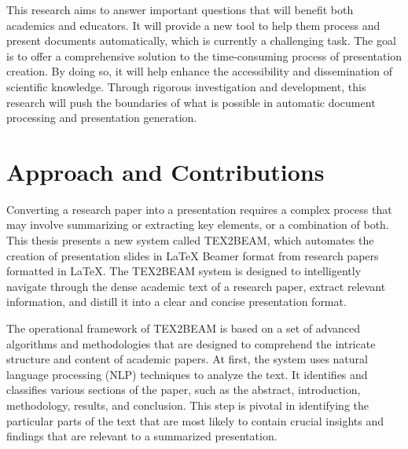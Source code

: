 This research aims to answer important questions that will benefit both academics and educators. It will provide a new tool to help them process and present documents automatically, which is currently a challenging task. The goal is to offer a comprehensive solution to the time-consuming process of presentation creation. By doing so, it will help enhance the accessibility and dissemination of scientific knowledge. Through rigorous investigation and development, this research will push the boundaries of what is possible in automatic document processing and presentation generation.

\section{Approach and Contributions}
\label{sec:intro:approach}


Converting a research paper into a presentation requires a complex process that may involve summarizing or extracting key elements, or a combination of both. This thesis presents a new system called TEX2BEAM, which automates the creation of presentation slides in \LaTeX{} Beamer format from research papers formatted in \LaTeX{}. The TEX2BEAM system is designed to intelligently navigate through the dense academic text of a research paper, extract relevant information, and distill it into a clear and concise presentation format.

The operational framework of TEX2BEAM is based on a set of advanced algorithms and methodologies that are designed to comprehend the intricate structure and content of academic papers. At first, the system uses natural language processing (NLP) techniques to analyze the text. It identifies and classifies various sections of the paper, such as the abstract, introduction, methodology, results, and conclusion. This step is pivotal in identifying the particular parts of the text that are most likely to contain crucial insights and findings that are relevant to a summarized presentation.

